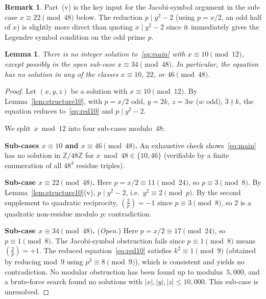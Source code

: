 \documentclass[12pt, a4paper]{amsart}
\theoremstyle{plain}
\newtheorem{lemma}[theorem]{Lemma}
\theoremstyle{definition}
\newtheorem{remark}[theorem]{Remark}
\begin{document}
\begin{remark}
  Part~(v) is the key input for the Jacobi-symbol argument in the
  sub-case $x \equiv 22 \pmod{48}$ below.  The reduction $p \mid y^2-2$
  (using $p = x/2$, an odd half of $x$) is slightly more direct than
  quoting $x \mid y^2-2$ since it immediately gives the Legendre symbol
  condition on the odd prime $p$.
\end{remark}

\begin{lemma}\label{lem:case1f}
  There is no integer solution to~\eqref{eq:main} with $x \equiv 10 \pmod{12}$,
  except possibly in the open sub-case $x \equiv 34 \pmod{48}$.
  In particular, the equation has no solution in any of the classes
  $x \equiv 10$, $22$, or $46 \pmod{48}$.
\end{lemma}

\begin{proof}
  Let $(x,y,z)$ be a solution with $x \equiv 10 \pmod{12}$.  By
  Lemma~\ref{lem:structure10}, with $p = x/2$ odd, $y = 2k$, $z = 3w$
  ($w$ odd), $3 \nmid k$, the equation reduces to~\eqref{eq:red10}
  and $p \mid y^2 - 2$.

  We split~$x \bmod 12$ into four sub-cases modulo~$48$:

  \textbf{Sub-cases $x \equiv 10$ and $x \equiv 46 \pmod{48}$.}
  An exhaustive check shows~\eqref{eq:main} has no solution in
  $\mathbb{Z}/48\mathbb{Z}$ for $x \bmod 48 \in \{10, 46\}$
  (verifiable by a finite enumeration of all $48^3$ residue triples).

  \textbf{Sub-case $x \equiv 22 \pmod{48}$.}
  Here $p = x/2 \equiv 11 \pmod{24}$, so $p \equiv 3 \pmod{8}$.
  By Lemma~\ref{lem:structure10}(v), $p \mid y^2 - 2$, i.e.\
  $y^2 \equiv 2 \pmod{p}$.
  By the second supplement to quadratic reciprocity,
  $\left(\tfrac{2}{p}\right) = -1$ since $p \equiv 3 \pmod{8}$,
  so $2$ is a quadratic non-residue modulo $p$: contradiction.

  \textbf{Sub-case $x \equiv 34 \pmod{48}$.}
  (\emph{Open.})  Here $p = x/2 \equiv 17 \pmod{24}$, so $p \equiv 1
  \pmod{8}$.  The Jacobi-symbol obstruction fails since $p \equiv 1
  \pmod{8}$ means $\left(\tfrac{2}{p}\right) = +1$.
  The reduced equation~\eqref{eq:red10} satisfies $k^2 \equiv 1 \pmod{9}$
  (obtained by reducing mod~$9$ using $p^3 \equiv 8 \pmod{9}$), which is
  consistent and yields no contradiction.
  No modular obstruction has been found up to modulus~$5{,}000$,
  and a brute-force search found no solutions with $|x|,|y|,|z| \le 10{,}000$.
  This sub-case is unresolved.
\end{proof}
\end{document}
